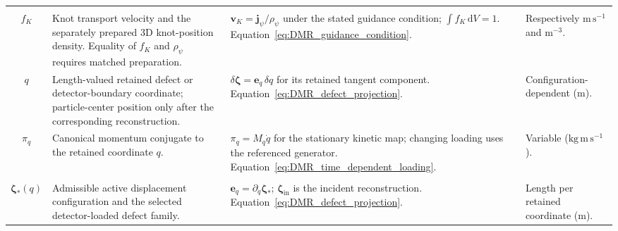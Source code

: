 \begin{longtable}{@{} c p{5.5cm} p{4cm} p{3.5cm} @{}}
\begin{tabular}[c]{@{}c@{}}$\mathbf v_K$ \\ $f_K$\end{tabular} & {\raggedright Knot transport velocity and the separately prepared 3D knot-position density. Equality of $f_K$ and $\rho_\psi$ requires matched preparation.\par} & {\raggedright $\mathbf v_K=\mathbf j_\psi/\rho_\psi$ under the stated guidance condition; $\int f_K\,\mathrm dV=1$. \newline Equation~\eqref{eq:DMR_guidance_condition}.\par} & {\raggedright Respectively $\mathrm{m\,s^{-1}}$ and $\mathrm{m^{-3}}$.\par} \\

$q$ & {\raggedright Length-valued retained defect or detector-boundary coordinate; particle-center position only after the corresponding reconstruction.\par} & {\raggedright $\delta\boldsymbol\zeta=\mathbf e_q\,\delta q$ for its retained tangent component. \newline Equation~\eqref{eq:DMR_defect_projection}.\par} & {\raggedright Configuration-dependent ($\mathrm m$).\par} \\

$\pi_q$ & {\raggedright Canonical momentum conjugate to the retained coordinate $q$.\par} & {\raggedright $\pi_q=M_q\dot q$ for the stationary kinetic map; changing loading uses the referenced generator. \newline Equation~\eqref{eq:DMR_time_dependent_loading}.\par} & {\raggedright Variable ($\mathrm{kg\,m\,s^{-1}}$).\par} \\

\begin{tabular}[c]{@{}c@{}}$\boldsymbol\zeta$ \\ $\boldsymbol\zeta_*(q)$\end{tabular} & {\raggedright Admissible active displacement configuration and the selected detector-loaded defect family.\par} & {\raggedright $\mathbf e_q=\partial_q\boldsymbol\zeta_*$; $\boldsymbol\zeta_{\mathrm{in}}$ is the incident reconstruction. \newline Equation~\eqref{eq:DMR_defect_projection}.\par} & {\raggedright Length per retained coordinate ($\mathrm m$).\par} \\


\end{longtable}
